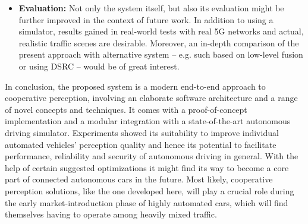 \begin{itemize}
	\item \textbf{Evaluation:} Not only the system itself, but also its evaluation might be further improved in the context of future work. In addition to using a simulator, results gained in real-world tests with real 5G networks and actual, realistic traffic scenes are desirable. Moreover, an in-depth comparison of the present approach with alternative system – e.g. such based on low-level fusion or using DSRC – would be of great interest.
\end{itemize}
\par
\bigskip

In conclusion, the proposed system is a modern end-to-end approach to cooperative perception, involving an elaborate software architecture and a range of novel concepts and techniques. It comes with a proof-of-concept implementation and a modular integration with a state-of-the-art autonomous driving simulator. Experiments showed its suitability to improve individual automated vehicles' perception quality and hence its potential to facilitate performance, reliability and security of autonomous driving in general. With the help of certain suggested optimizations it might find its way to become a core part of connected autonomous cars in the future. Most likely, cooperative perception solutions, like the one developed here, will play a crucial role during the early market-introduction phase of highly automated cars, which will find themselves having to operate among heavily mixed traffic. 